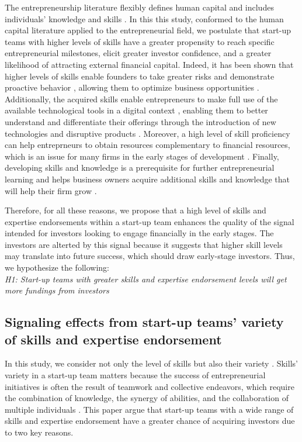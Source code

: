 \documentclass[12pt]{article}
\begin{document}
The entrepreneurship literature flexibly defines human capital and includes individuals' knowledge and skills \citep{becker1964human, marvel2016human}. In this this study, conformed to the human capital literature applied to the entrepreneurial field, we postulate that start-up teams with higher levels of skills have a greater propensity to reach specific entrepreneurial milestones, elicit greater investor confidence, and a greater likelihood of attracting external financial capital. Indeed, it has been shown that higher levels of skills enable founders to take greater risks and demonstrate proactive behavior \citep{becherer1999proactive}, allowing them to optimize business opportunities \citep{shane2000promise, chandler1994founder}. Additionally, the acquired skills enable entrepreneurs to make full use of the available technological tools in a digital context \citep{nambisan2017digital}, enabling them to better understand and differentiate their offerings through the introduction of new technologies and disruptive products \citep{marvel2007technology}. Moreover, a high level of skill proficiency can help entreprneurs to obtain resources complementary to financial resources, which is an issue for many firms in the early stages of development \citep{beckman2007early, zarutskie2010role}. Finally, developing skills and knowledge is a prerequisite for further entrepreneurial learning and helps business owners acquire additional skills and knowledge that will help their firm grow \citep{hunter1986cognitive}.

Therefore, for all these reasons, we propose that a high level of skills and expertise endorsements within a start-up team enhances the quality of the signal intended for investors looking to engage financially in the early stages. The investors are alterted by this signal because it suggests that higher skill levels may translate into future success, which should draw early-stage investors. Thus, we hypothesize the following: \\

\noindent \textit{H1: Start-up teams with greater skills and expertise endorsement levels will get more fundings from investors}

\subsection{Signaling effects from start-up teams' variety of skills and expertise endorsement}

In this study, we consider not only the level of skills but also their variety \citep{harrison2007s, grillitsch2021does}. Skills' variety in a start-up team matters because the success of entrepreneurial initiatives is often the result of teamwork and collective endeavors, which require the combination of knowledge, the synergy of abilities, and the collaboration of multiple individuals \citep{klotz2014new}. This paper argue that start-up teams with a wide range of skills and expertise endorsement have a greater chance of acquiring investors due to two key reasons.
\end{document}
